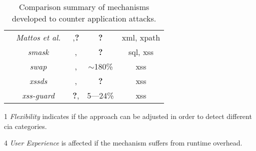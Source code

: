 \documentclass[conference]{IEEEtran}
\newcommand{\tick}{\ding{52}}
\newcommand{\xmark}{\ding{56}}
\begin{document}
\begin{table*}
\begin{threeparttable}
\begin{small}
{\begin{tabular}{l|c|cc|c}
	& 	{\it Mattos et al.}~\cite{MSM13} & \tick,{\bf ?} &  {\bf ?} & {\sc xml}, {\sc xp}ath \\
	& 	{\it {\sc sm}ask}~\cite{JB07} & \xmark,\xmark & {\bf ?} & {\sc sql}, {\sc xss} \\
	& 	{\it {\sc swap}}~\cite{WPLKK09} & \tick,\tick & $\sim$180\% & {\sc xss} \\ 
    & 	{\it {\sc xssds}}~\cite{JEP08}  & \xmark,\xmark & {\bf ?} &  {\sc xss} \\
    & 	{\it {\sc xss-guard}}~\cite{BV08} & {\bf ?},\xmark & 5---24\% & {\sc xss} \\
	\hline
    \end{tabular}}
    \begin{tablenotes}
	\begin{footnotesize}
       \item[1] {\it Flexibility} indicates if the approach can be adjusted
	in order to detect different {\sc cia} categories.
       \item[4] {\it User Experience} is affected if the mechanism suffers
	from runtime overhead.
	\end{footnotesize}
    \end{tablenotes}
    \caption{Comparison summary of mechanisms developed to counter application attacks.}
    \label{tab:comp2}
    \end{small}
    \end{threeparttable}
\end{table*}



\end{document}

